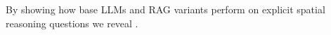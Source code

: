 By showing how base LLMs and RAG variants perform on explicit spatial reasoning questions we reveal .
 














